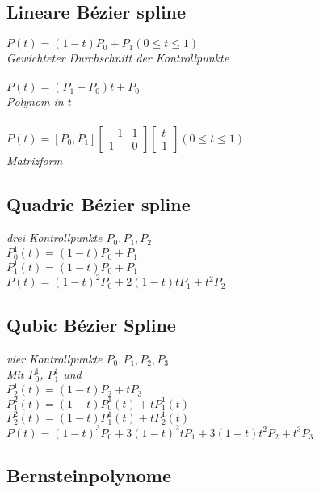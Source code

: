 \subsection{Lineare Bézier spline}

$P(t) = (1 - t) P_0 + P_1 (0 \leq t \leq 1)$ \\
\textit{Gewichteter Durchschnitt der Kontrollpunkte} \\
\\
$P(t) = (P_1 - P_0) t + P_0$ \\
\textit{Polynom in $t$} \\
\\
$P(t) = [P_0, P_1] \begin{bmatrix}
    -1 & 1 \\ 1 & 0
\end{bmatrix}
\begin{bmatrix}
    t \\ 1
\end{bmatrix} (0 \leq t \leq 1)$ \\
\textit{Matrizform}

\subsection{Quadric Bézier spline}

\textit{drei Kontrollpunkte $P_0, P_1, P_2$}\\

$P_0^1(t) = (1-t)P_0 + P_1$ \\
$P_1^1(t) = (1-t)P_0 + P_1$ \\

$P(t) = (1 - t)^2P_0 + 2(1 - t)tP_1 + t^2 P_2$

\subsection{Qubic Bézier Spline}

\textit{vier Kontrollpunkte $P_0, P_1, P_2, P_3$}\\

\textit{Mit $P_0^1$, $P_1^1$ und} \\
$P_2^1(t) = (1-t)P_2 + tP_3$ \\

$P_1^2(t) = (1 - t) P_0^1(t) + tP_1^1(t)$ \\
$P_2^2(t) = (1 - t) P_1^1(t) + tP_2^1(t)$ \\

$P(t) = (1 - t)^3P_0 + 3(1 - t)^2tP_1 + 3(1 - t)t^2P_2 + t^3P_3$

\subsection{Bernsteinpolynome}


